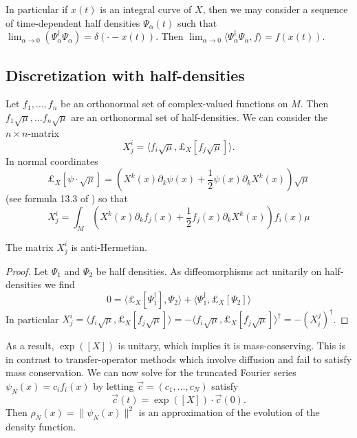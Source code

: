 In particular if $x(t)$ is an integral curve of $X$, then we may consider a sequence of time-dependent half densities $\Psi_\alpha(t)$ such that $\lim_{\alpha \to 0}( \Psi_\alpha^\dagger \Psi_\alpha) = \delta( \cdot - x(t) )$.
Then $\lim_{\alpha \to 0 } \langle \Psi_\alpha^\dagger \Psi_\alpha , f \rangle = f(x (t) )$.

\subsection{Discretization with half-densities}
Let $f_1, \dots, f_n$ be an orthonormal set of complex-valued functions on $M$.  Then $f_1 \sqrt{\mu} , \dots f_n \sqrt{\mu}$ are an orthonormal set of half-densities.  We can consider the $n \times n$-matrix
\[
	X_{j}^{i} = \langle f_i \sqrt{\mu} , \pounds_X [f_j \sqrt{\mu}]  \rangle.
\]
In normal coordinates
\[
	\pounds_X[ \psi \cdot \sqrt{\mu} ] = ( X^k(x) \partial_k \psi(x) + \frac{1}{2} \psi(x) \partial_k X^k(x) ) \sqrt{\mu}
\]
(see formula 13.3 of \cite{Meyer1993}) so that
\[
	X_j^i = \int_{M} ( X^k(x) \partial_k f_j(x) + \frac{1}{2} f_j(x) \partial_k X^k(x) ) f_i(x) \mu
\]
\begin{proposition}
	The matrix $X^i_j$ is anti-Hermetian.
\end{proposition}
\begin{proof}
	Let $\Psi_1$ and $\Psi_2$ be half densities.  As diffeomorphisms act unitarily on half-densities we find
	\[
		0 = \langle \pounds_X [\Psi_1^\dagger] , \Psi_2 \rangle + \langle \Psi_1^\dagger, \pounds_X[\Psi_2] \rangle
	\]
	In particular $X^i_j = \langle f_i \sqrt{\mu} , \pounds_X [f_j \sqrt{\mu}]  \rangle =  - \langle f_i \sqrt{\mu} , \pounds_X [f_j \sqrt{\mu}]  \rangle^\dagger = -(X^j_i)^\dagger$.
\end{proof}
As a result, $\exp([X])$ is unitary, which implies it is mass-conserving.  This is in contrast to transfer-operator methods which involve diffusion and fail to satisfy mass conservation.
We can now solve for the truncated Fourier series $\psi_N(x) = c_i f_i(x)$ by  letting $\vec{c} = (c_1, \dots, c_N)$ satisfy
\[
	\vec{c}(t) = \exp( [X] ) \cdot \vec{c}(0).
\]
Then $\rho_N(x) = \|\psi_N(x) \|^2$ is an approximation of the evolution of the density function.
